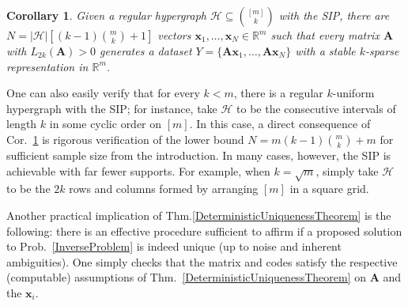 \documentclass[9pt,twocolumn]{pnas-new}
\newtheorem{corollary}{Corollary}
\begin{document}
\begin{corollary}\label{DeterministicUniquenessCorollary}
Given a regular hypergraph $\mathcal{H} \subseteq {[m] \choose k}$ with the SIP, there are $N =  |\mathcal{H}| \left[ (k-1){m \choose k} + 1  \right]$ vectors \mbox{$\mathbf{x}_1, \ldots, \mathbf{x}_N \in \mathbb{R}^m$} such that every matrix $\mathbf{A}$ with $L_{2k}(\mathbf{A}) > 0$ generates a dataset $Y = \{\mathbf{A}\mathbf{x}_1, \ldots, \mathbf{A}\mathbf{x}_N\}$ with a stable $k$-sparse representation in $\mathbb{R}^m$.
\end{corollary}

One can also easily verify that for every $k < m$, there is a regular $k$-uniform hypergraph with the SIP; for instance, take $\mathcal{H}$ to be the consecutive intervals of length $k$ in some cyclic order on $[m]$.  In this case, a direct consequence of Cor.~\ref{DeterministicUniquenessCorollary} is rigorous verification of the lower bound \mbox{$N = m(k-1){m \choose k} + m$} for sufficient sample size from the introduction. In many cases, however, the SIP is achievable with far fewer supports.  For example, when $k = \sqrt{m}$, simply take $\mathcal{H}$ to be the $2k$ rows and columns formed by arranging $[m]$ in a square grid.

Another practical implication of Thm.\ref{DeterministicUniquenessTheorem} is the following: there is an effective procedure sufficient to affirm if a proposed solution to Prob.~\ref{InverseProblem} is indeed unique (up to noise and inherent ambiguities). One simply checks that the matrix and codes satisfy the respective (computable) assumptions of Thm.~\ref{DeterministicUniquenessTheorem} on $\mathbf{A}$ and the $\mathbf{x}_i$.  
\end{document}
